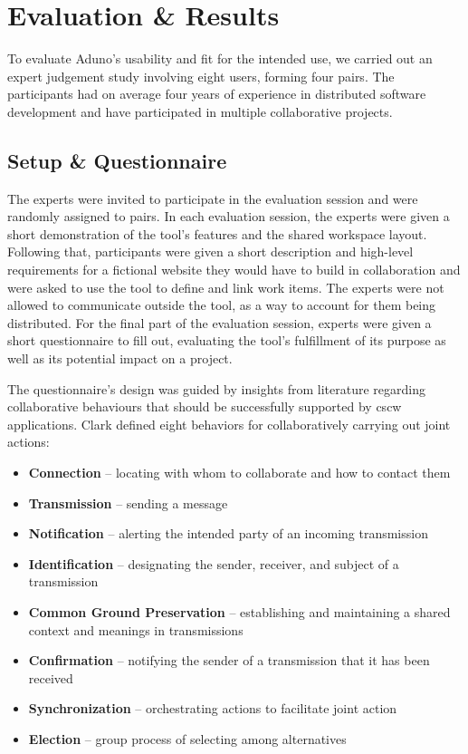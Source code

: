 \documentclass[conference]{IEEEtran}
\begin{document}
\section{Evaluation \& Results}
\label{sec:evaluation}

To evaluate Aduno's usability and fit for the intended use, we carried out an expert judgement study involving eight users, forming four pairs. The participants had on average four years of experience in distributed software development and have participated in multiple collaborative projects.


\subsection{Setup \& Questionnaire}
The experts were invited to participate in the evaluation session and were randomly assigned to pairs. In each evaluation session, the experts were given a short demonstration of the tool's features and the shared workspace layout. Following that, participants were given a short description and high-level requirements for a fictional website they would have to build in collaboration and were asked to use the tool to define and link work items. The experts were not allowed to communicate outside the tool, as a way to account for them being distributed. For the final part of the evaluation session, experts were given a short questionnaire to fill out, evaluating the tool's fulfillment of its purpose as well as its potential impact on a project.

The questionnaire's design was guided by insights from literature regarding collaborative behaviours that should be successfully supported by {\sc cscw} applications. Clark \cite{Clark96} defined eight behaviors for collaboratively carrying out joint actions:

\begin{itemize}
\item \textbf{Connection} -- locating with whom to collaborate and how to contact them
\item \textbf{Transmission} -- sending a message
\item \textbf{Notification} -- alerting the intended party of an incoming transmission
\item \textbf{Identification} -- designating the sender, receiver, and subject of a transmission
\item \textbf{Common Ground Preservation} -- establishing and maintaining a shared context and meanings in transmissions
\item \textbf{Confirmation} -- notifying the sender of a transmission that it has been received
\item \textbf{Synchronization} -- orchestrating actions to facilitate joint action
\item \textbf{Election} -- group process of selecting among alternatives
\end{itemize}
\end{document}
